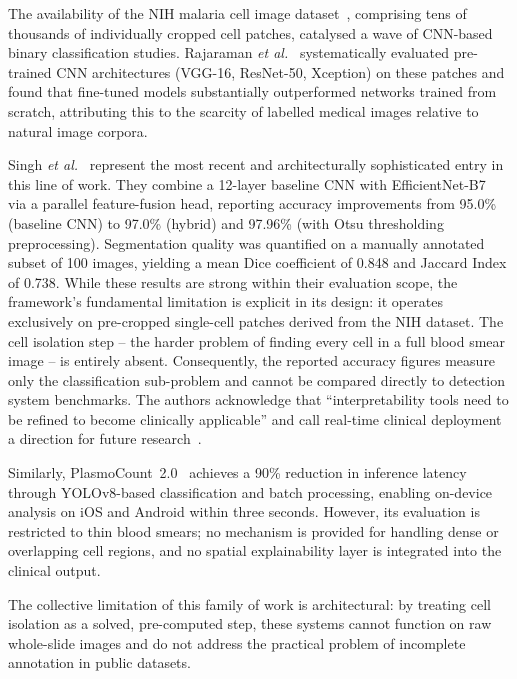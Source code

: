 \documentclass[10pt,twocolumn]{article}
\newcommand{\etal}{\textit{et al.}}
\begin{document}
The availability of the NIH malaria cell image dataset~\cite{rajaraman2019},
comprising tens of thousands of individually cropped cell patches,
catalysed a wave of CNN-based binary classification studies. Rajaraman
\etal~\cite{rajaraman2019} systematically evaluated pre-trained CNN
architectures (VGG-16, ResNet-50, Xception) on these patches and found
that fine-tuned models substantially outperformed networks trained from
scratch, attributing this to the scarcity of labelled medical images
relative to natural image corpora.

Singh \etal~\cite{singh2025} represent the most recent and architecturally
sophisticated entry in this line of work. They combine a 12-layer baseline
CNN with EfficientNet-B7~\cite{tan2019} via a parallel feature-fusion head,
reporting accuracy improvements from 95.0\% (baseline CNN) to 97.0\% (hybrid)
and 97.96\% (with Otsu thresholding preprocessing). Segmentation quality
was quantified on a manually annotated subset of 100 images, yielding a
mean Dice coefficient of 0.848 and Jaccard Index of 0.738. While these
results are strong within their evaluation scope, the framework's fundamental
limitation is explicit in its design: it operates exclusively on pre-cropped
single-cell patches derived from the NIH dataset. The cell isolation step --
the harder problem of finding every cell in a full blood smear image -- is
entirely absent. Consequently, the reported accuracy figures measure only
the classification sub-problem and cannot be compared directly to detection
system benchmarks. The authors acknowledge that ``interpretability tools
need to be refined to become clinically applicable'' and call real-time
clinical deployment a direction for future research~\cite{singh2025}.

Similarly, PlasmoCount~2.0~\cite{plasmocount2025} achieves a 90\% reduction
in inference latency through YOLOv8-based classification and batch
processing, enabling on-device analysis on iOS and Android within three
seconds. However, its evaluation is restricted to thin blood smears; no
mechanism is provided for handling dense or overlapping cell regions, and
no spatial explainability layer is integrated into the clinical output.

The collective limitation of this family of work is architectural: by
treating cell isolation as a solved, pre-computed step, these systems
cannot function on raw whole-slide images and do not address the
practical problem of incomplete annotation in public datasets.

\end{document}
